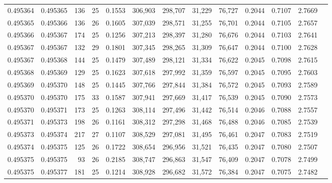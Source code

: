 \begin{tabular}{rrrrrrrrrrrrr}
0.495364 & 0.495365 & 136 &  25 &                                     0.1553 & 306,903 & 298,707 &  31,229 &  76,727 & 0.2044 & 0.7107 & 2.7669 \\
0.495365 & 0.495366 & 136 &  26 &                                     0.1605 & 307,039 & 298,571 &  31,255 &  76,701 & 0.2044 & 0.7105 & 2.7657 \\
0.495366 & 0.495367 & 174 &  25 &                                     0.1256 & 307,213 & 298,397 &  31,280 &  76,676 & 0.2044 & 0.7103 & 2.7641 \\
0.495367 & 0.495367 & 132 &  29 &                                     0.1801 & 307,345 & 298,265 &  31,309 &  76,647 & 0.2044 & 0.7100 & 2.7628 \\
0.495367 & 0.495368 & 144 &  25 &                                     0.1479 & 307,489 & 298,121 &  31,334 &  76,622 & 0.2045 & 0.7098 & 2.7615 \\
0.495368 & 0.495369 & 129 &  25 &                                     0.1623 & 307,618 & 297,992 &  31,359 &  76,597 & 0.2045 & 0.7095 & 2.7603 \\
0.495369 & 0.495370 & 148 &  25 &                                     0.1445 & 307,766 & 297,844 &  31,384 &  76,572 & 0.2045 & 0.7093 & 2.7589 \\
0.495370 & 0.495370 & 175 &  33 &                                     0.1587 & 307,941 & 297,669 &  31,417 &  76,539 & 0.2045 & 0.7090 & 2.7573 \\
0.495370 & 0.495371 & 173 &  25 &                                     0.1263 & 308,114 & 297,496 &  31,442 &  76,514 & 0.2046 & 0.7088 & 2.7557 \\
0.495371 & 0.495373 & 198 &  26 &                                     0.1161 & 308,312 & 297,298 &  31,468 &  76,488 & 0.2046 & 0.7085 & 2.7539 \\
0.495373 & 0.495374 & 217 &  27 &                                     0.1107 & 308,529 & 297,081 &  31,495 &  76,461 & 0.2047 & 0.7083 & 2.7519 \\
0.495374 & 0.495375 & 125 &  26 &                                     0.1722 & 308,654 & 296,956 &  31,521 &  76,435 & 0.2047 & 0.7080 & 2.7507 \\
0.495375 & 0.495375 &  93 &  26 &                                     0.2185 & 308,747 & 296,863 &  31,547 &  76,409 & 0.2047 & 0.7078 & 2.7499 \\
0.495375 & 0.495377 & 181 &  25 &                                     0.1214 & 308,928 & 296,682 &  31,572 &  76,384 & 0.2047 & 0.7075 & 2.7482 \\

\end{tabular}
